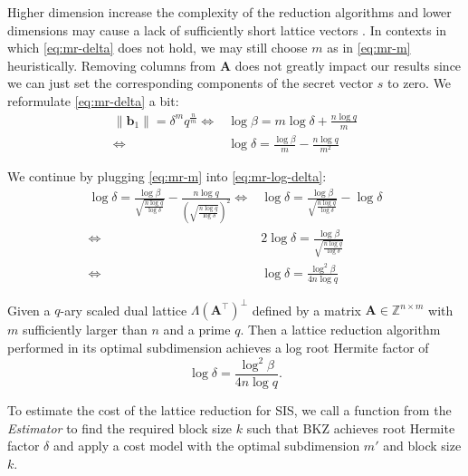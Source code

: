 Higher dimension increase the complexity of the reduction algorithms and lower dimensions may cause a lack of sufficiently short lattice vectors \cite{MR09}. In contexts in which \cref{eq:mr-delta} does not hold, we may still choose $m$ as in \cref{eq:mr-m} heuristically. Removing columns from $\mathbf{A}$ does not greatly impact our results since we can just set the corresponding components of the secret vector $s$ to zero. We reformulate \cref{eq:mr-delta} a bit:
\begin{align}
  \|\mathbf{b}_1\| = \delta^m q^{\frac{n}{m}} \iff & \log \beta = m \log \delta + \frac{n \log q}{m}                                   \\
  \iff                                             & \log \delta = \frac{\log \beta}{m} - \frac{n \log q}{m^2} \label{eq:mr-log-delta}
\end{align}

We continue by plugging \cref{eq:mr-m} into \cref{eq:mr-log-delta}:
\begin{align}
  \log \delta = \frac{\log \beta}{\sqrt{\frac{n \log q}{\log \delta}}} - \frac{n \log q}{\left(\sqrt{\frac{n \log q}{\log \delta}}\right)^2} \iff & \log \delta = \frac{\log \beta}{\sqrt{\frac{n \log q}{\log \delta}}} - \log \delta \\
  \iff                                                                                                                                            & 2\log \delta = \frac{\log \beta}{\sqrt{\frac{n \log q}{\log \delta}}}              \\
  \iff                                                                                                                                            & \log \delta = \frac{\log^2 \beta}{4n \log q}
\end{align}

\begin{theorem}
  Given a $q$-ary scaled dual lattice $\Lambda(\mathbf{A}^\intercal)^{\perp}$ defined by a matrix $\mathbf{A} \in \mathbb{Z}^{n \times m}$ with $m$ sufficiently larger than $n$ and a prime $q$. Then a lattice reduction algorithm performed in its optimal subdimension achieves a log root Hermite factor of
  \begin{equation}
    \log \delta = \frac{\log^2 \beta}{4n \log q}. \label{eq:mr-log-RHF}
  \end{equation}
\end{theorem}

To estimate the cost of the lattice reduction for SIS, we call a function from the \textit{Estimator} to find the required block size $k$ such that BKZ achieves root Hermite factor $\delta$ and apply a cost model with the optimal subdimension $m'$ and block size $k$.

